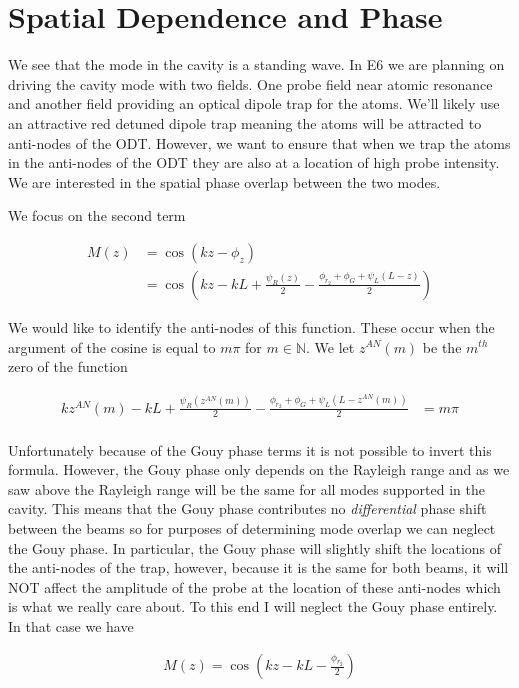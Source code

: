 \documentclass[12pt]{article}
\begin{document}
\section{Spatial Dependence and Phase}

We see that the mode in the cavity is a standing wave. In E6 we are planning on driving the cavity mode with two fields. One probe field near atomic resonance and another field providing an optical dipole trap for the atoms. We'll likely use an attractive red detuned dipole trap meaning the atoms will be attracted to anti-nodes of the ODT. However, we want to ensure that when we trap the atoms in the anti-nodes of the ODT they are also at a location of high probe intensity. We are interested in the spatial phase overlap between the two modes. 

We focus on the second term

\begin{align}
M(z) &= \cos\left(kz - \phi_z\right)\\
&= \cos\left(kz - kL +\frac{\psi_R(z)}{2} - \frac{\phi_{r_2} + \phi_G + \psi_L(L-z)}{2} \right)
\end{align}

We would like to identify the anti-nodes of this function. These occur when the argument of the cosine is equal to $m\pi$ for $m\in \mathbb{N}$. We let $z^{AN}(m)$ be the $m^{th}$ zero of the function

\begin{align}
k z^{AN}(m) -kL +\frac{\psi_R\left(z^{AN}(m)\right)}{2} - \frac{\phi_{r_2} + \phi_G + \psi_L\left(L-z^{AN}(m)\right)}{2} &= m\pi\\ 
\end{align}

Unfortunately because of the Gouy phase terms it is not possible to invert this formula. However, the Gouy phase only depends on the Rayleigh range and as we saw above the Rayleigh range will be the same for all modes supported in the cavity. This means that the Gouy phase contributes no \textit{differential} phase shift between the beams so for purposes of determining mode overlap we can neglect the Gouy phase. In particular, the Gouy phase will slightly shift the locations of the anti-nodes of the trap, however, because it is the same for both beams, it will NOT affect the amplitude of the probe at the location of these anti-nodes which is what we really care about. To this end I will neglect the Gouy phase entirely. In that case we have

\begin{align}
M(z) = \cos\left(kz - kL - \frac{\phi_{r_2}}{2}\right)
\end{align}
\end{document}
